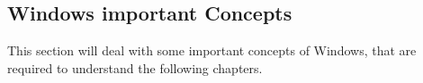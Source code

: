 \subsection{Windows important Concepts}
This section will deal with some important concepts of Windows, that are required to understand the following chapters.


